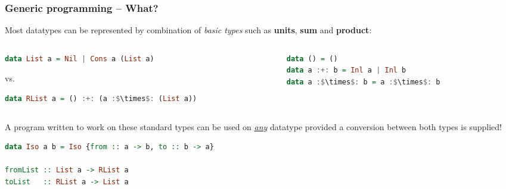 \documentclass[10pt]{beamer}
\begin{document}
\begin{frame}[fragile]
\frametitle{Generic programming -- What?}
Most datatypes can be represented by combination of {\color{blue}\emph{basic types}} such as \textbf{units}, \textbf{sum} and \textbf{product}:

\begin{columns}
\begin{column}{.40\textwidth}
\begin{lstlisting}[language=Haskell,basicstyle=\ttfamily\scriptsize]
data List a = Nil | Cons a (List a)
\end{lstlisting} 
\vspace{-3pt}vs.
\begin{lstlisting}[language=Haskell,basicstyle=\ttfamily\scriptsize,mathescape]
data RList a = () :+: (a :$\times$: (List a))
\end{lstlisting}
\end{column}
\begin{column}{.35\textwidth}
\begin{lstlisting}[language=Haskell,basicstyle=\ttfamily\scriptsize,mathescape]
data () = ()
data a :+: b = Inl a | Inl b
data a :$\times$: b = a :$\times$: b
\end{lstlisting}
\end{column}
\end{columns}
A program written to work on these standard types can be used on \underline{\emph{any}} datatype provided a conversion between both types is supplied!

\begin{lstlisting}[language=Haskell,basicstyle=\ttfamily\scriptsize]
data Iso a b = Iso {from :: a -> b, to :: b -> a}

fromList :: List a -> RList a
toList   :: RList a -> List a
\end{lstlisting}

\end{frame}
\end{document}
